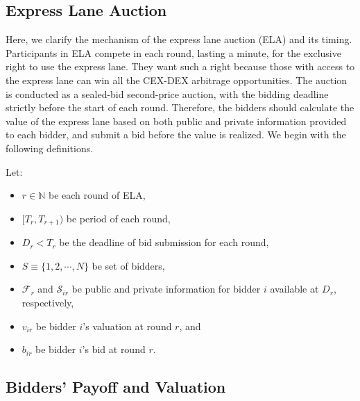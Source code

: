 \documentclass[runningheads]{llncs}
\begin{document}
\subsection{Express Lane Auction}
Here, we clarify the mechanism of the express lane auction (ELA) and its timing. Participants in ELA compete in each round, lasting a minute, for the exclusive right to use the express lane. They want such a right because those with access to the express lane can win all the CEX-DEX arbitrage opportunities. The auction is conducted as a sealed-bid second-price auction, with the bidding deadline strictly before the start of each round. Therefore, the bidders should calculate the value of the express lane based on both public and private information provided to each bidder, and submit a bid before the value is realized. We begin with the following definitions.
\begin{defn}
    Let: \begin{itemize}
        \item \(r \in \mathbb N\) be each round of ELA,
        \item \([T_r, T_{r+1})\) be period of each round,
        \item \(D_r < T_r\) be the deadline of bid submission for each round,
        \item \(S \equiv \{1, 2, \cdots, N\}\) be set of bidders,
        \item \(\mathcal F_r\) and \(\mathcal S_{ir}\) be public and private information for bidder \(i\) available at \(D_r\), respectively,
        \item \(v_{ir} \) be bidder \(i\)'s valuation at round \(r\), and
        \item \(b_{ir}\) be bidder \(i\)'s bid at round \(r\).
    \end{itemize}
\end{defn}

\subsection{Bidders' Payoff and Valuation}
\end{document}
